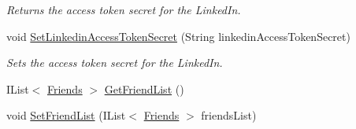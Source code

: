 \begin{DoxyCompactItemize}
\begin{DoxyCompactList}\small\item\em Returns the access token secret for the Linked\+In. \end{DoxyCompactList}\item 
void \hyperlink{classcom_1_1shephertz_1_1app42_1_1paas_1_1sdk_1_1csharp_1_1social_1_1_social_a71039e1cdcd88eb4a010a3f47ff10d04}{Set\+Linkedin\+Access\+Token\+Secret} (String linkedin\+Access\+Token\+Secret)
\begin{DoxyCompactList}\small\item\em Sets the access token secret for the Linked\+In. \end{DoxyCompactList}\item 
I\+List$<$ \hyperlink{classcom_1_1shephertz_1_1app42_1_1paas_1_1sdk_1_1csharp_1_1social_1_1_social_1_1_friends}{Friends} $>$ \hyperlink{classcom_1_1shephertz_1_1app42_1_1paas_1_1sdk_1_1csharp_1_1social_1_1_social_a943d0bfef56001458da3b6f7b4378ac3}{Get\+Friend\+List} ()
\item 
void \hyperlink{classcom_1_1shephertz_1_1app42_1_1paas_1_1sdk_1_1csharp_1_1social_1_1_social_ac824aee4d49900dc638c7e18cd2e96b9}{Set\+Friend\+List} (I\+List$<$ \hyperlink{classcom_1_1shephertz_1_1app42_1_1paas_1_1sdk_1_1csharp_1_1social_1_1_social_1_1_friends}{Friends} $>$ friends\+List)
\end{DoxyCompactItemize}
